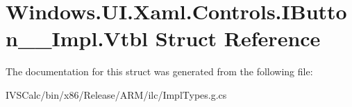 \hypertarget{struct_windows_1_1_u_i_1_1_xaml_1_1_controls_1_1_i_button_____impl_1_1_vtbl}{}\section{Windows.\+U\+I.\+Xaml.\+Controls.\+I\+Button\+\_\+\+\_\+\+Impl.\+Vtbl Struct Reference}
\label{struct_windows_1_1_u_i_1_1_xaml_1_1_controls_1_1_i_button_____impl_1_1_vtbl}


The documentation for this struct was generated from the following file\+:\begin{DoxyCompactItemize}
\item 
I\+V\+S\+Calc/bin/x86/\+Release/\+A\+R\+M/ilc/Impl\+Types.\+g.\+cs\end{DoxyCompactItemize}
